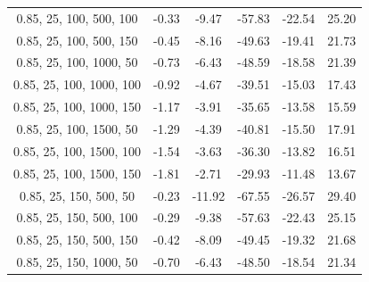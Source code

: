 \documentclass[
]{article}
\begin{document}
\begin{table}[H]
{\begin{tabular}{|c|c|c|c|c|c|}
                0.85, 25, 100, 500, 100    & -0.33                      & -9.47                      & -57.83                     & -22.54                   & 25.20                   \\
                0.85, 25, 100, 500, 150    & -0.45                      & -8.16                      & -49.63                     & -19.41                   & 21.73                   \\
                0.85, 25, 100, 1000, 50    & -0.73                      & -6.43                      & -48.59                     & -18.58                   & 21.39                   \\
                0.85, 25, 100, 1000, 100   & -0.92                      & -4.67                      & -39.51                     & -15.03                   & 17.43                   \\
                0.85, 25, 100, 1000, 150   & -1.17                      & -3.91                      & -35.65                     & -13.58                   & 15.59                   \\
                0.85, 25, 100, 1500, 50    & -1.29                      & -4.39                      & -40.81                     & -15.50                   & 17.91                   \\
                0.85, 25, 100, 1500, 100   & -1.54                      & -3.63                      & -36.30                     & -13.82                   & 16.51                   \\
                0.85, 25, 100, 1500, 150   & -1.81                      & -2.71                      & -29.93                     & -11.48                   & 13.67                   \\
                0.85, 25, 150, 500, 50     & -0.23                      & -11.92                     & -67.55                     & -26.57                   & 29.40                   \\
                0.85, 25, 150, 500, 100    & -0.29                      & -9.38                      & -57.63                     & -22.43                   & 25.15                   \\
                0.85, 25, 150, 500, 150    & -0.42                      & -8.09                      & -49.45                     & -19.32                   & 21.68                   \\
                0.85, 25, 150, 1000, 50    & -0.70                      & -6.43                      & -48.50                     & -18.54                   & 21.34                   \\

\end{tabular}}
\end{table}
\end{document}
